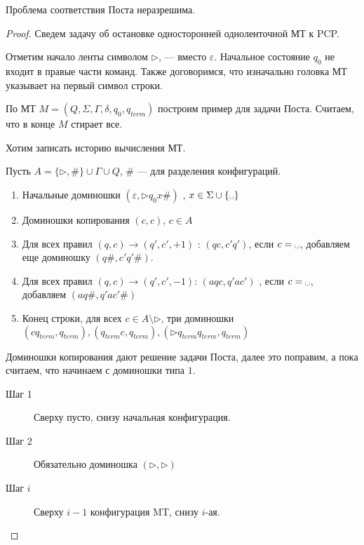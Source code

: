 \begin{thm}[Пост, 1946]
    Проблема соответствия Поста неразрешима.
\end{thm}
\begin{proof}
    Сведем задачу об остановке односторонней одноленточной МТ к PCP. 
    
    Отметим начало ленты символом $ \triangleright$, \textvisiblespace --- вместо  $ \varepsilon $. Начальное состояние $  q_0$ не входит в правые части команд. Также договоримся, что изначально головка МТ указывает на первый символ строки.

	По МТ $ M = (Q, \Sigma, \Gamma, \delta , q_0, q_{term})$ построим пример для задачи Поста.
	Считаем, что в конце $ M$ стирает все.

	Хотим записать историю вычисления МТ.

	Пусть $ A = \{\triangleright, \#\} \cup \Gamma \cup  Q$, $ \#$ --- для разделения конфигураций.

	\begin{enumerate}
		\item Начальные доминошки $ ( \varepsilon , \triangleright q_0 x \#)$ , $ x \in \Sigma \cup \{\text{\textvisiblespace}\}$
		\item Доминошки копирования $ (c, c)$, $ c \in A $ 
		\item  Для всех правил $ (q, c) \to  (q', c', +1)$ : $(qc, c'q')$, если $ c = \text{\textvisiblespace}$, добавляем еще доминошку $ (q\# , c'q'\#)$.
		\item Для всех правил $ (q, c) \to  (q', c', -1)$: $ (aqc, q'ac')$ , если $ c = \text{\textvisiblespace}$, добавляем $ (aq\#, q'ac'\#)$ 
		\item Конец строки, для всех $ c \in A \setminus \triangleright$, три доминошки
			$ (cq_{term}, q_{term}), (q_{term}c, q_{term}), (\triangleright q_{term}q_{term}, q_{term})$
	\end{enumerate} 
	\begin{note}
	    Доминошки копирования дают решение задачи Поста, далее это поправим, а пока считаем, что начинаем с доминошки типа $ 1$.
	\end{note}
	\begin{description}
		\item[Шаг 1] Сверху пусто, снизу начальная конфигурация.
		\item[Шаг 2] Обязательно доминошка $ (\triangleright, \triangleright)$ 
		\item[Шаг $ i$] Сверху $ i-1$ конфигурация MT, снизу  $ i$-ая.
		

\end{description}
\end{proof}
